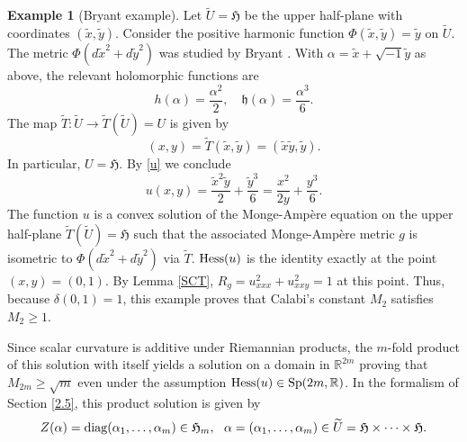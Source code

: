 \documentclass[11pt,reqno]{amsart}
\newcommand{\R}{\mathbb{R}}
\renewcommand{\geq}{\geqslant}
\theoremstyle{plain}
\theoremstyle{definition}
\newtheorem{example}[theorem]{Example}
\numberwithin{equation}{section}
\begin{document}
\begin{example}[Bryant example]\label{Exn=1}
Let $\widetilde{U}=\mathfrak{H}$ be the upper half-plane with coordinates $(\tilde{x},\tilde{y} )$. Consider the positive harmonic function $\Phi(\tilde{x},\tilde{y})=\tilde{y}$ on $\widetilde{U}$. The metric $\Phi(d\tilde{x}^2+d\tilde{y}^2)$ was studied by Bryant \cite{Bryantexample}.
With $\alpha = \tilde{x} + \sqrt{-1}\tilde{y}$ as above, the relevant holomorphic functions are
$$h(\alpha) = \frac{\alpha^2}{2}, \quad \mathfrak{h}(\alpha) = \frac{\alpha^3}{6}.$$
The map $\widetilde{T}: \widetilde{U}\to \widetilde{T} (\widetilde{U}) = U$ is given by
$$(x,y)=\widetilde{T}(\tilde{x}, \tilde{y})=(\tilde{x} \tilde{y},\tilde{y}).$$
In particular, $U=\mathfrak{H}$.
By \eqref{u} we conclude
$$
u(x,y) =  \frac{\tilde{x}^2\tilde{y}}{2}+\frac{\tilde{y}^3}{6} = \frac{x^2}{2y}+\frac{y^3}{6}.$$
The function $u$ is a convex solution of the Monge-Ampère equation on the upper half-plane $\widetilde{T}(\widetilde{U})=\mathfrak{H}$ such that the associated Monge-Ampère metric $g$ is isometric to $\Phi(d\tilde{x}^2 + d\tilde{y}^2)$ via $\widetilde{T}$. ${\rm Hess}(u)$ is the identity exactly at the point $(x,y)=(0,1)$. By Lemma \ref{SCT}, $R_g = u_{xxx}^2 + u_{xxy}^2 = 1$ at this point. Thus, because $\delta(0,1) = 1$, this example proves that Calabi's constant $M_2$ satisfies $M_2 \geq 1$.

Since scalar curvature is additive under Riemannian products, the $m$-fold product of this solution with itself yields a solution on a domain in $\mathbb{R}^{2m}$ proving that $M_{2m} \geq \sqrt{m}$ even under the assumption ${\rm Hess}(u)\in {\rm Sp}(2m,\R)$. 
In the formalism of Section \ref{2.5}, this product solution is given by
$$Z({\alpha})={\rm diag}(\alpha_1,\ldots,\alpha_m) \in \mathfrak{H}_m,  \ \ \alpha = (\alpha_1,\ldots,\alpha_m) \in \widetilde{U}=\mathfrak{H} \times \cdots \times \mathfrak{H}.$$ 
\end{example}
\end{document}
